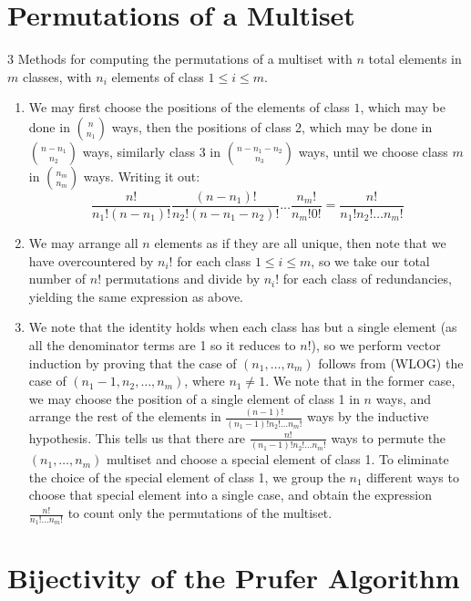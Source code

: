 \documentclass{article}
\begin{document}
\section{Permutations of a Multiset}

3 Methods for computing the permutations of a multiset with $n$ total elements in $m$ classes, with $n_i$ elements of class $1 \le i \le m$.
\begin{enumerate}
\item We may first choose the positions of the elements of class $1$, which may be done in $\binom{n}{n_1}$ ways, then the positions of class 2, which may be done in $\binom{n-n_1}{n_2}$ ways, similarly class 3 in $\binom{n-n_1-n_2}{n_3}$ ways, until we choose class $m$ in $\binom{n_m}{n_m}$ ways. Writing it out:
$$\frac{n!}{n_1!(n-n_1)!}\frac{(n-n_1)!}{n_2!(n-n_1-n_2)!}\ldots\frac{n_m!}{n_m!0!} = \frac{n!}{n_1!n_2!\ldots n_m!}$$
\item We may arrange all $n$ elements as if they are all unique, then note that we have overcountered by $n_i!$ for each class $1 \le i \le m$, so we take our total number of $n!$ permutations and divide by $n_i!$ for each class of redundancies, yielding the same expression as above.
\item We note that the identity holds when each class has but a single element (as all the denominator terms are 1 so it reduces to $n!$), so we perform vector induction by proving that the case of $(n_1, \ldots, n_m)$ follows from (WLOG) the case of $(n_1 - 1, n_2, \ldots, n_m)$, where $n_1 \ne 1$. We note that in the former case, we may choose the position of a single element of class 1 in $n$ ways, and arrange the rest of the elements in $\frac{(n-1)!}{(n_1-1)!n_2!\ldots n_m!}$ ways by the inductive hypothesis. This tells us that there are $\frac{n!}{(n_1-1)!n_2!\ldots n_m!}$ ways to permute the $(n_1, \ldots, n_m)$ multiset and choose a special element of class 1. To eliminate the choice of the special element of class 1, we group the $n_1$ different ways to choose that special element into a single case, and obtain the expression $\frac{n!}{n_1!\ldots n_m!}$ to count only the permutations of the multiset. 
\end{enumerate}

\section{Bijectivity of the Prufer Algorithm}
\end{document}
